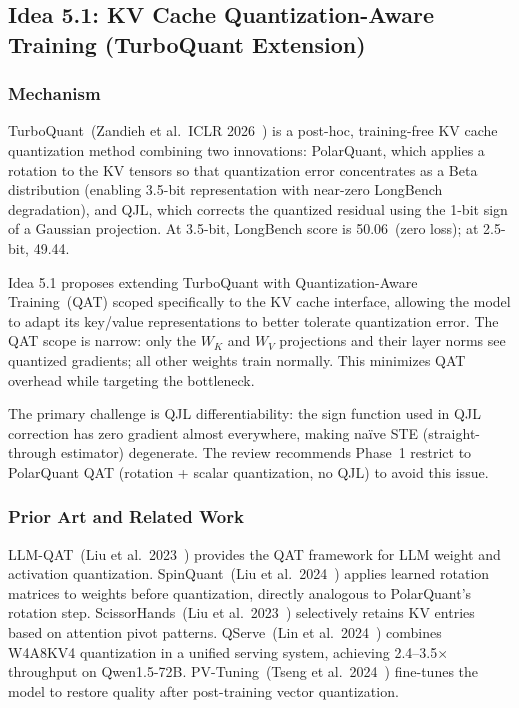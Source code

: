 \documentclass[11pt]{article}
\begin{document}
\subsection{Idea 5.1: KV Cache Quantization-Aware Training (TurboQuant Extension)}
\label{subsec:idea51}

\subsubsection*{Mechanism}

TurboQuant~(Zandieh et al.\ ICLR 2026~\cite{ZandiehTurboQuant2026}) is a post-hoc, training-free KV cache quantization method combining two innovations: PolarQuant, which applies a rotation to the KV tensors so that quantization error concentrates as a Beta distribution (enabling 3.5-bit representation with near-zero LongBench degradation), and QJL, which corrects the quantized residual using the 1-bit sign of a Gaussian projection. At 3.5-bit, LongBench score is 50.06~(zero loss); at 2.5-bit, 49.44.

Idea 5.1 proposes extending TurboQuant with Quantization-Aware Training~(QAT) scoped specifically to the KV cache interface, allowing the model to adapt its key/value representations to better tolerate quantization error. The QAT scope is narrow: only the $W_K$ and $W_V$ projections and their layer norms see quantized gradients; all other weights train normally. This minimizes QAT overhead while targeting the bottleneck.

The primary challenge is QJL differentiability: the sign function used in QJL correction has zero gradient almost everywhere, making na\"{i}ve STE (straight-through estimator) degenerate. The review recommends Phase~1 restrict to PolarQuant QAT (rotation + scalar quantization, no QJL) to avoid this issue.

\subsubsection*{Prior Art and Related Work}

LLM-QAT~(Liu et al.\ 2023~\cite{LiuLLMQAT2023}) provides the QAT framework for LLM weight and activation quantization. SpinQuant~(Liu et al.\ 2024~\cite{LiuSpinQuant2024}) applies learned rotation matrices to weights before quantization, directly analogous to PolarQuant's rotation step. ScissorHands~(Liu et al.\ 2023~\cite{LiuScissorHands2023}) selectively retains KV entries based on attention pivot patterns. QServe~(Lin et al.\ 2024~\cite{LinQServe2024}) combines W4A8KV4 quantization in a unified serving system, achieving 2.4--3.5$\times$ throughput on Qwen1.5-72B. PV-Tuning~(Tseng et al.\ 2024~\cite{TsengPVTuning2024}) fine-tunes the model to restore quality after post-training vector quantization.
\end{document}
